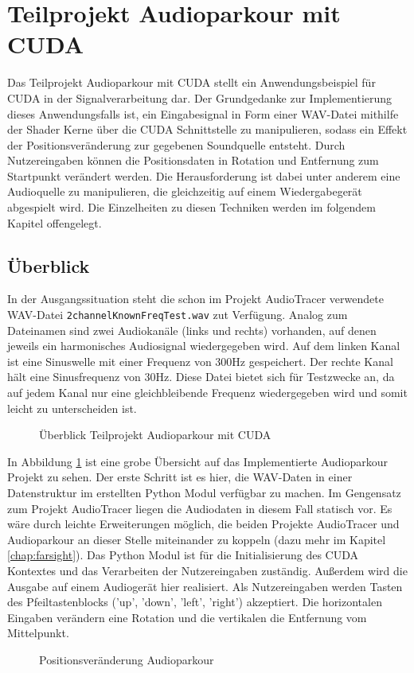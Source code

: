 
\section{Teilprojekt Audioparkour mit CUDA} \label{CUDA_PARKOUR}

Das Teilprojekt Audioparkour mit CUDA stellt ein Anwendungsbeispiel für CUDA in der Signalverarbeitung dar. Der Grundgedanke zur Implementierung dieses Anwendungsfalls ist, ein Eingabesignal in Form einer WAV-Datei mithilfe der Shader Kerne über die CUDA Schnittstelle zu manipulieren, sodass ein Effekt der Positionsveränderung zur gegebenen Soundquelle entsteht. Durch Nutzereingaben können die Positionsdaten in Rotation und Entfernung zum Startpunkt verändert werden. Die Herausforderung ist dabei unter anderem eine Audioquelle zu manipulieren, die gleichzeitig auf einem Wiedergabegerät abgespielt wird. Die Einzelheiten zu diesen Techniken werden im folgendem Kapitel offengelegt.

\subsection{Überblick} \label{sub:manipulator_ov}
In der Ausgangssituation steht die schon im Projekt AudioTracer verwendete WAV-Datei \texttt{2channelKnownFreqTest.wav} zut Verfügung. Analog zum Dateinamen sind zwei Audiokanäle (links und rechts) vorhanden, auf denen jeweils ein harmonisches Audiosignal wiedergegeben wird. Auf dem linken Kanal ist eine Sinuswelle mit einer Frequenz von 300Hz gespeichert. Der rechte Kanal hält eine Sinusfrequenz von 30Hz. Diese Datei bietet sich für Testzwecke an, da auf jedem Kanal nur eine gleichbleibende Frequenz wiedergegeben wird und somit leicht zu unterscheiden ist. 
\begin{figure}[h!]
	\centering      
	\def\svgscale{0.75}
	
	\caption{Überblick Teilprojekt Audioparkour mit CUDA}
	\label{fig:manipulatorOV}
\end{figure}

In Abbildung \ref{fig:manipulatorOV} ist eine grobe Übersicht auf das Implementierte Audioparkour Projekt zu sehen. Der erste Schritt ist es hier, die WAV-Daten in einer Datenstruktur im erstellten Python Modul verfügbar zu machen. Im Gengensatz zum Projekt AudioTracer liegen die Audiodaten in diesem Fall statisch vor. Es wäre durch leichte Erweiterungen möglich, die beiden Projekte AudioTracer und Audioparkour an dieser Stelle miteinander zu koppeln (dazu mehr im Kapitel \ref{chap:farsight}). Das Python Modul ist für die Initialisierung des CUDA Kontextes und das Verarbeiten der Nutzereingaben zuständig. Außerdem wird die Ausgabe auf einem Audiogerät hier realisiert. Als Nutzereingaben werden Tasten des Pfeiltastenblocks ('up', 'down', 'left', 'right') akzeptiert. Die horizontalen Eingaben verändern eine Rotation und die vertikalen die Entfernung vom Mittelpunkt. 
\begin{figure}[h!]
	\centering      
	\def\svgscale{0.5}
	
	\caption{Positionsveränderung Audioparkour}
	\label{fig:audioparkourClock}
\end{figure}

